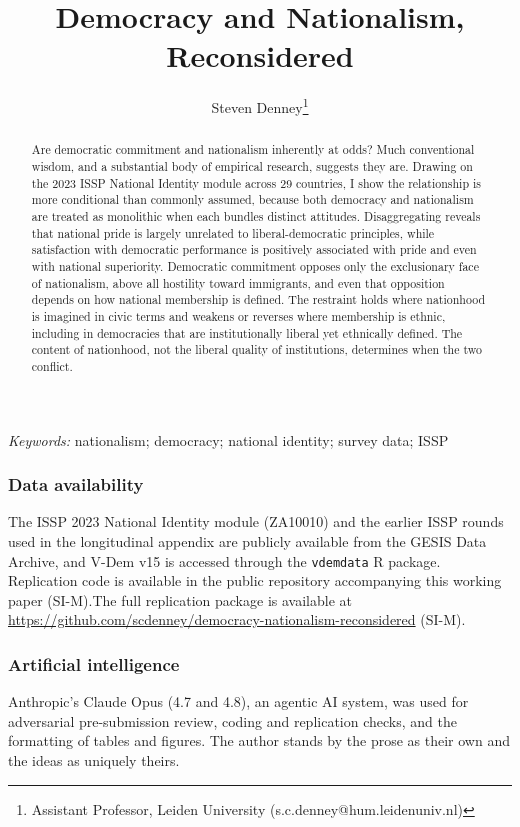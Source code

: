 \documentclass[12pt]{article}
\title{\bfseries Democracy and Nationalism, Reconsidered}
\author{\ifanon\else Steven Denney\thanks{Assistant Professor, Leiden University (s.c.denney@hum.leidenuniv.nl)}\fi}
\date{}
\begin{document}
{\singlespacing
\maketitle
\thispagestyle{empty}

\begin{abstract}
\noindent Are democratic commitment and nationalism inherently at odds? Much conventional wisdom, and a substantial body of empirical research, suggests they are. Drawing on the 2023 ISSP National Identity module across 29 countries, I show the relationship is more conditional than commonly assumed, because both democracy and nationalism are treated as monolithic when each bundles distinct attitudes. Disaggregating reveals that national pride is largely unrelated to liberal-democratic principles, while satisfaction with democratic performance is positively associated with pride and even with national superiority. Democratic commitment opposes only the exclusionary face of nationalism, above all hostility toward immigrants, and even that opposition depends on how national membership is defined. The restraint holds where nationhood is imagined in civic terms and weakens or reverses where membership is ethnic, including in democracies that are institutionally liberal yet ethnically defined. The content of nationhood, not the liberal quality of institutions, determines when the two conflict.
\end{abstract}

\medskip
\noindent\textit{Keywords:} nationalism; democracy; national identity; survey data; ISSP
}

\newpage
\setcounter{page}{1}      %


\bigskip
{\singlespacing
\subsubsection*{Data availability}
\noindent The ISSP 2023 National Identity module (ZA10010) and the earlier ISSP rounds used in the longitudinal appendix are publicly available from the GESIS Data Archive, and V-Dem v15 is accessed through the \texttt{vdemdata} R package. \ifanon Replication code is available in the public repository accompanying this working paper (SI-M).\else The full replication package is available at \url{https://github.com/scdenney/democracy-nationalism-reconsidered} (SI-M).\fi

\subsubsection*{Artificial intelligence}
\noindent Anthropic's Claude Opus (4.7 and 4.8), an agentic AI system, was used for adversarial pre-submission review, coding and replication checks, and the formatting of tables and figures. The author stands by the prose as their own and the ideas as uniquely theirs.
\par}


\end{document}

